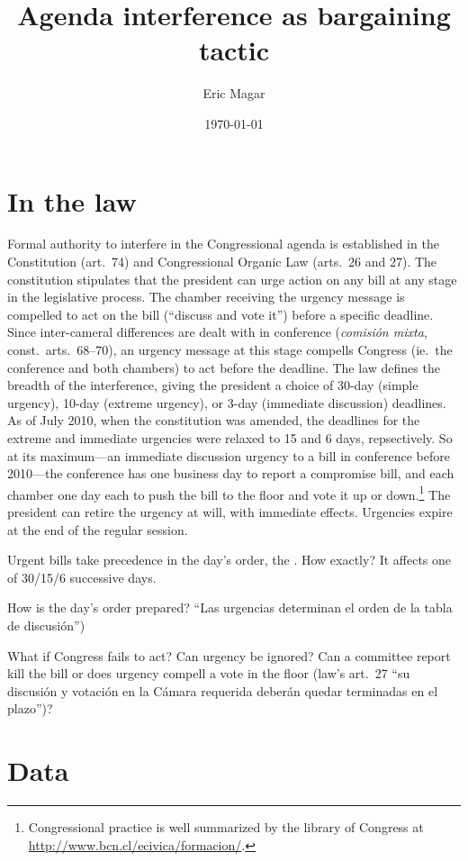 \documentclass{article}
\begin{document}
\title{Agenda interference as bargaining tactic}
\author{Eric Magar}
\date{\today}
\maketitle

\section{In the law}

Formal authority to interfere in the Congressional agenda is established in the Constitution (art.\ 74) and Congressional Organic Law (arts.\ 26 and 27). The constitution stipulates that the president can urge action on any bill at any stage in the legislative process. The chamber receiving the urgency message is compelled to act on the bill (``discuss and vote it'') before a specific deadline. Since inter-cameral differences are dealt with in conference (\emph{comisión mixta}, const.\ arts.\ 68--70), an urgency message at this stage compells Congress (ie.\ the conference and both chambers) to act before the deadline. The law defines the breadth of the interference, giving the president a choice of 30-day (simple urgency), 10-day (extreme urgency), or 3-day (immediate discussion) deadlines. As of July 2010, when the constitution was amended, the deadlines for the extreme and immediate urgencies were relaxed to 15 and 6 days, repsectively. So at its maximum---an immediate discussion urgency to a bill in conference before 2010---the conference has one business day to report a compromise bill, and each chamber one day each to push the bill to the floor and vote it up or down.\footnote{Congressional practice is well summarized by the library of Congress at \url{http://www.bcn.cl/ecivica/formacion/}.} The president can retire the urgency at will, with immediate effects. Urgencies expire at the end of the regular session. 

Urgent bills take precedence in the day's order, the . How exactly? It affects one of 30/15/6 successive days. 

How is the day's order prepared? ``Las urgencias determinan el orden de la tabla de discusión'')

What if Congress fails to act? Can urgency be ignored? Can a committee report kill the bill or does urgency compell a vote in the floor (law's art.\ 27 ``su discusión y votación en la Cámara requerida deberán quedar terminadas en el plazo'')?

\section{Data}
\end{document}

